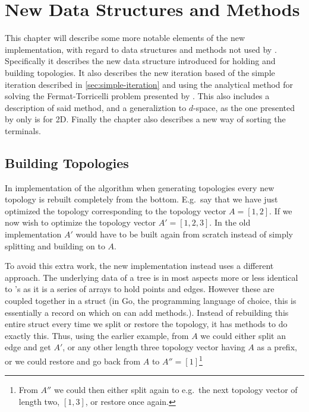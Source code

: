  {
\abnormalparskip{0pt}
\chapter{New Data Structures and Methods}
\label{cha:new-data-structures}
}

This chapter will describe some more notable elements of the new implementation,
with regard to data structures and methods not used by
\textcite{smith1992}. Specifically it describes the new data structure
introduced for holding and building topologies. It also describes the new
iteration based of the simple iteration described in \cref{sec:simple-iteration}
and using the analytical method for solving the Fermat-Torricelli problem
presented by \textcite{uteshev2014}. This also includes a description of said
method, and a generaliztion to $d$-space, as the one presented by
\textcite{uteshev2014} only is for 2D. Finally the chapter also describes a new
way of sorting the terminals.

\section{Building Topologies}
\label{sec:building-topologies}

In \textcite{smith1992} implementation of the algorithm when generating
topologies every new topology is rebuilt completely from the bottom. E.g.\ say
that we have just optimized the topology corresponding to the topology vector
$A = [1, 2]$. If we now wish to optimize the topology vector
$A' = [1, 2, 3]$. In the old implementation $A'$ would have to be built again
from scratch instead of simply splitting and building on to $A$.

To avoid this extra work, the new implementation instead uses a different
approach. The underlying data of a tree is in most aspects more or less
identical to \citeauthor{smith1992}'s as it is a series of arrays to hold points
and edges. However these are coupled together in a struct (in Go, the
programming language of choice, this is essentially a record on which on can add
methods.). Instead of rebuilding this entire struct every time we split or
restore the topology, it has methods to do exactly this. Thus, using the earlier
example, from $A$ we could either split an
edge and get $A'$, or any other length three topology vector having $A$ as a
prefix, or we could restore and go back from $A$ to $A'' = [1]$\footnote{From
  $A''$ we could then either split again to e.g.\ the next topology vector of
  length two, $[1, 3]$, or restore once again.}

